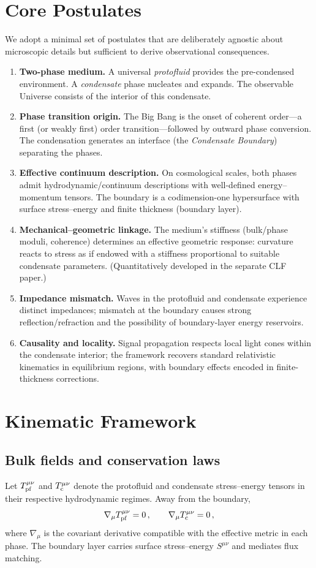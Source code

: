 \documentclass[11pt,a4paper]{article}
\begin{document}
\section{Core Postulates}
\label{sec:postulates}
We adopt a minimal set of postulates that are deliberately agnostic about microscopic details but sufficient to derive observational consequences.
\begin{enumerate}
    \item \textbf{Two-phase medium.} A universal \emph{protofluid} provides the pre-condensed environment. A \emph{condensate} phase nucleates and expands. The observable Universe consists of the interior of this condensate.
    \item \textbf{Phase transition origin.} The Big Bang is the onset of coherent order---a first (or weakly first) order transition---followed by outward phase conversion. The condensation generates an interface (the \emph{Condensate Boundary}) separating the phases.
    \item \textbf{Effective continuum description.} On cosmological scales, both phases admit hydrodynamic/continuum descriptions with well-defined energy--momentum tensors. The boundary is a codimension-one hypersurface with surface stress--energy and finite thickness (boundary layer).
    \item \textbf{Mechanical--geometric linkage.} The medium's stiffness (bulk/phase moduli, coherence) determines an effective geometric response: curvature reacts to stress as if endowed with a stiffness proportional to suitable condensate parameters. (Quantitatively developed in the separate CLF paper.)
    \item \textbf{Impedance mismatch.} Waves in the protofluid and condensate experience distinct impedances; mismatch at the boundary causes strong reflection/refraction and the possibility of boundary-layer energy reservoirs.
    \item \textbf{Causality and locality.} Signal propagation respects local light cones within the condensate interior; the framework recovers standard relativistic kinematics in equilibrium regions, with boundary effects encoded in finite-thickness corrections.
\end{enumerate}

\section{Kinematic Framework}
\subsection{Bulk fields and conservation laws}
Let $T^{\mu\nu}_{\rm pf}$ and $T^{\mu\nu}_{\rm c}$ denote the protofluid and condensate stress--energy tensors in their respective hydrodynamic regimes. Away from the boundary,
\begin{equation}
\nabla_\mu T^{\mu\nu}_{\rm pf}=0\,,\qquad 
\nabla_\mu T^{\mu\nu}_{\rm c}=0\,,
\end{equation}
where $\nabla_\mu$ is the covariant derivative compatible with the effective metric in each phase. The boundary layer carries surface stress--energy $S^{\mu\nu}$ and mediates flux matching.
\end{document}
